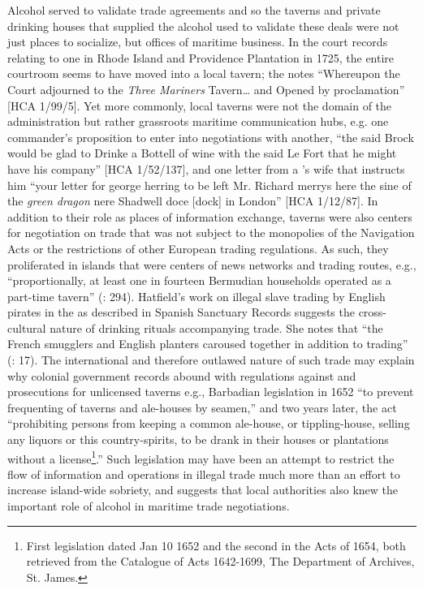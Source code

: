 Alcohol served to validate trade agreements and so the taverns and private drinking houses that supplied the alcohol used to validate these deals were not just places to socialize, but offices of maritime business. In the court records relating to one  in Rhode Island and Providence Plantation in 1725, the entire courtroom seems to have moved into a local tavern; the  notes “Whereupon the Court adjourned to the \textit{Three Mariners} Tavern… and Opened by proclamation” [HCA 1/99/5]. Yet more commonly, local taverns were not the domain of the administration but rather grassroots maritime communication hubs, e.g. one commander’s proposition to enter into negotiations with another, “the said Brock would be glad to Drinke a Bottell of wine with the said Le Fort that he might have his company” [HCA 1/52/137], and  one letter from a ’s wife that instructs him “your letter for george herring to be left Mr. Richard merrys here the sine of the \textit{green dragon} nere Shadwell doce [dock] in London” [HCA 1/12/87]. In addition to their role as places of information exchange, taverns were also centers for negotiation on  trade that was not subject to the monopolies of the Navigation Acts or the restrictions of other European trading regulations. As such, they proliferated in islands that were centers of news networks and trading routes, e.g., “proportionally, at least one in fourteen Bermudian households operated as a part-time tavern” (\citealt{Jarvis2010}: 294). Hatfield’s work on illegal slave trading by English pirates in the  as described in Spanish Sanctuary Records suggests the cross-cultural nature of drinking rituals accompanying trade.  She notes that “the French smugglers and English planters caroused together in addition to trading” (\citealt{Hatfield2016}: 17). The international and therefore outlawed nature of such trade may explain why colonial government records abound with regulations against and prosecutions for unlicensed taverns e.g., Barbadian legislation in 1652 “to prevent frequenting of taverns and ale-houses by seamen,” and two years later, the act “prohibiting persons from keeping a common ale-house, or tippling-house, selling any liquors or this country-spirits, to be drank in their houses or plantations without a license\footnote{First legislation dated Jan 10 1652 and the second in the Acts of 1654, both retrieved from the Catalogue of {Acts 1642}-1699, The  Department of Archives, St. James.}.” Such legislation may have been an attempt to restrict the flow of information and operations in illegal trade much more than an effort to increase island-wide sobriety, and suggests that local authorities also knew the important role of alcohol in maritime trade negotiations. 

